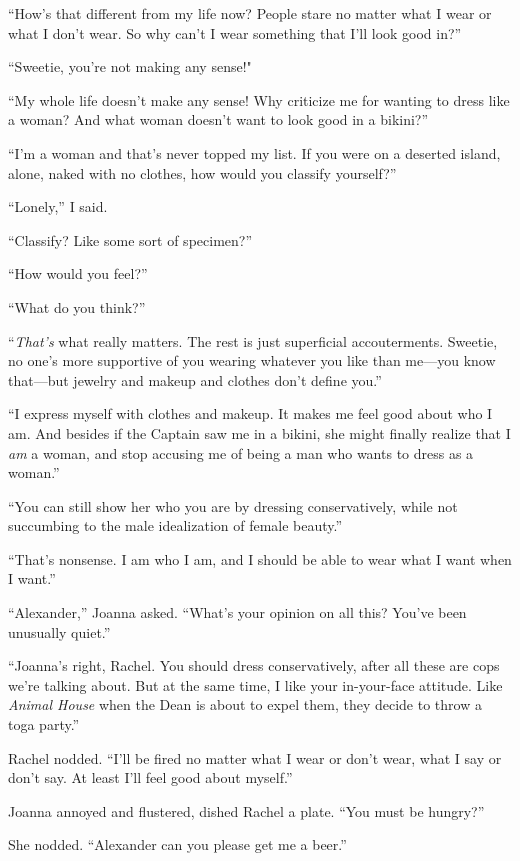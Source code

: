 ``How's that different from my life now? People stare no matter what I
wear or what I don't wear. So why can't I wear something that I'll look
good in?''

``Sweetie, you're not making any sense!"

``My whole life doesn't make any sense! Why criticize me for wanting to
dress like a woman? And what woman doesn't want to look good in a
bikini?''

``I'm a woman and that's never topped my list. If you were on a deserted
island, alone, naked with no clothes, how would you classify yourself?''

``Lonely,'' I said.

``Classify? Like some sort of specimen?''

``How would you feel?''

``What do you think?''

``\emph{That's} what really matters. The rest is just superficial
accouterments. Sweetie, no one's more supportive of you wearing whatever
you like than me---you know that---but jewelry and makeup and clothes
don't define you.''

``I express myself with clothes and makeup. It makes me feel good about
who I am. And besides if the Captain saw me in a bikini, she might
finally realize that I \emph{am} a woman, and stop accusing me of being
a man who wants to dress as a woman.''

``You can still show her who you are by dressing conservatively, while
not succumbing to the male idealization of female beauty.''

``That's nonsense. I am who I am, and I should be able to wear what I
want when I want.''

``Alexander,'' Joanna asked. ``What's your opinion on all this? You've
been unusually quiet.''

``Joanna's right, Rachel. You should dress conservatively, after all
these are cops we're talking about. But at the same time, I like your
in-your-face attitude. Like \emph{Animal House} when the Dean is about
to expel them, they decide to throw a toga party.''

Rachel nodded. ``I'll be fired no matter what I wear or don't wear, what
I say or don't say. At least I'll feel good about myself.''

Joanna annoyed and flustered, dished Rachel a plate. ``You must be
hungry?''

She nodded. ``Alexander can you please get me a beer.''

